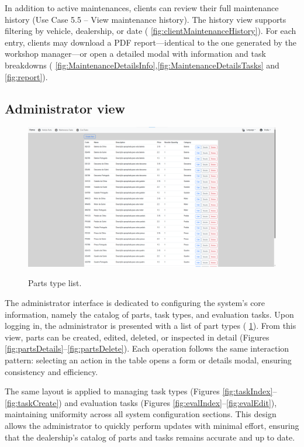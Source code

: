 In addition to active maintenances, clients can review their full maintenance history (Use Case 5.5 – View maintenance history). The history view supports filtering by vehicle, dealership, or date ( \ref{fig:clientMaintenanceHistory}). For each entry, clients may download a PDF report—identical to the one generated by the workshop manager—or open a detailed modal with information and task breakdowns ( \ref{fig:MaintenanceDetailsInfo},\ref{fig:MaintenanceDetailsTasks} and \ref{fig:report}).



\subsection{Administrator view}


\begin{figure}[h]
  \caption{Parts type list.}
  \centering
  \includegraphics[width=\textwidth]{figs/Implementation/dealershipAdmin/partsIndex}
  \label{fig:partsIndex}
\end{figure}



The administrator interface is dedicated to configuring the system's core information, namely the catalog of parts, task types, and evaluation tasks. Upon logging in, the administrator is presented with a list of part types ( \ref{fig:partsIndex}). From this view, parts can be created, edited, deleted, or inspected in detail (Figures \ref{fig:partsDetails}–\ref{fig:partsDelete}). Each operation follows the same interaction pattern: selecting an action in the table opens a form or details modal, ensuring consistency and efficiency.




The same layout is applied to managing task types (Figures \ref{fig:taskIndex}–\ref{fig:taskCreate}) and evaluation tasks (Figures \ref{fig:evalIndex}–\ref{fig:evalEdit}), maintaining uniformity across all system configuration sections. This design allows the administrator to quickly perform updates with minimal effort, ensuring that the dealership's catalog of parts and tasks remains accurate and up to date.


